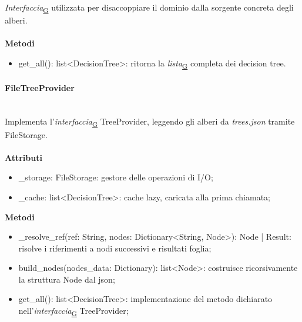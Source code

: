 \documentclass[a4paper,12pt]{article}
\begin{document}
                    \textit{Interfaccia}\textsubscript{\href{https://atlasteam9.github.io/Atlas/glossario.html\#Interfaccia}{G}} utilizzata per disaccoppiare il dominio dalla sorgente concreta degli alberi.\\\\
                    \textbf{Metodi}
                    \begin{itemize}
                        \item {\ttfamily get\_all(): list<DecisionTree>}: ritorna la \textit{lista}\textsubscript{\href{https://atlasteam9.github.io/Atlas/glossario.html\#Lista}{G}} completa dei decision tree.
                    \end{itemize}
                
                \paragraph{FileTreeProvider}\mbox{}\\
                    Implementa l'\textit{interfaccia}\textsubscript{\href{https://atlasteam9.github.io/Atlas/glossario.html\#Interfaccia}{G}} TreeProvider, leggendo gli alberi da \textit{trees.json} tramite FileStorage.\\\\
                    \textbf{Attributi}
                        \begin{itemize}
                            \item {\ttfamily \_storage: FileStorage}: gestore delle operazioni di I/O;
                            \item {\ttfamily \_cache: list<DecisionTree>}: cache lazy, caricata alla prima chiamata;
                        \end{itemize}
                    \textbf{Metodi}
                    \begin{itemize}
                        \item {\ttfamily \_resolve\_ref(ref: String, nodes: Dictionary<String, Node>): Node | Result}: risolve i riferimenti a nodi successivi e risultati foglia;
                        \item {\ttfamily build\_nodes(nodes\_data: Dictionary): list<Node>}: costruisce ricorsivamente la struttura Node dal json;
                        \item {\ttfamily get\_all(): list<DecisionTree>}: implementazione del metodo dichiarato nell'\textit{interfaccia}\textsubscript{\href{https://atlasteam9.github.io/Atlas/glossario.html\#Interfaccia}{G}} TreeProvider;
                    \end{itemize}
\end{document}
